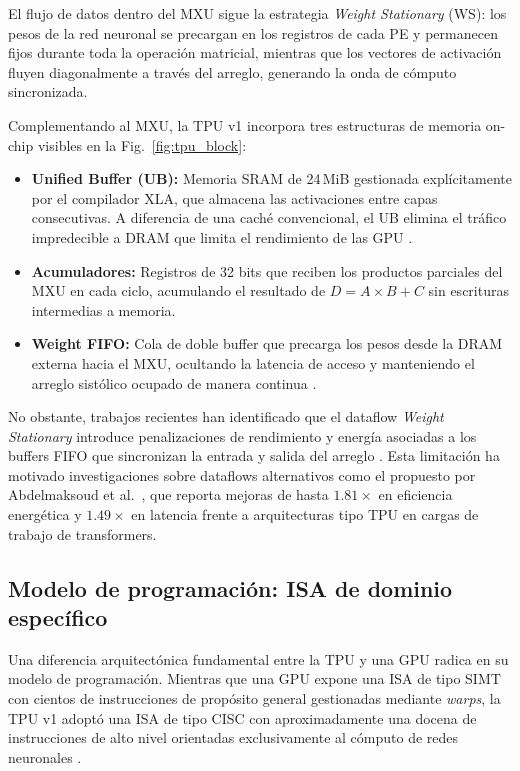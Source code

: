 \documentclass[conference]{IEEEtran}
\begin{document}
El flujo de datos dentro del MXU sigue la estrategia \textit{Weight Stationary} (WS): los pesos de la red neuronal se precargan en los registros de cada PE y permanecen fijos durante toda la operación matricial, mientras que los vectores de activación fluyen diagonalmente a través del arreglo, generando la onda de cómputo sincronizada.
 
Complementando al MXU, la TPU v1 incorpora tres estructuras de memoria on-chip visibles en la Fig.~\ref{fig:tpu_block}:
 
\begin{itemize}
    \item \textbf{Unified Buffer (UB):} Memoria SRAM de 24\,MiB gestionada explícitamente por el compilador XLA, que almacena las activaciones entre capas consecutivas. A diferencia de una caché convencional, el UB elimina el tráfico impredecible a DRAM que limita el rendimiento de las GPU \cite{jouppi2023tpuv4}.
 
    \item \textbf{Acumuladores:} Registros de 32 bits que reciben los productos parciales del MXU en cada ciclo, acumulando el resultado de $D = A \times B + C$ sin escrituras intermedias a memoria.
 
    \item \textbf{Weight FIFO:} Cola de doble buffer que precarga los pesos desde la DRAM externa hacia el MXU, ocultando la latencia de acceso y manteniendo el arreglo sistólico ocupado de manera continua \cite{jouppi2017tpu}.
\end{itemize}
 
No obstante, trabajos recientes han identificado que el dataflow \textit{Weight Stationary} introduce penalizaciones de rendimiento y energía asociadas a los buffers FIFO que sincronizan la entrada y salida del arreglo \cite{abdelmaksoud2026dip}. Esta limitación ha motivado investigaciones sobre dataflows alternativos como el propuesto por Abdelmaksoud et al.~\cite{abdelmaksoud2026dip}, que reporta mejoras de hasta $1.81\times$ en eficiencia energética y $1.49\times$ en latencia frente a arquitecturas tipo TPU en cargas de trabajo de transformers.
 

\subsection{Modelo de programación: ISA de dominio específico}

Una diferencia arquitectónica fundamental entre la TPU y una GPU radica en su modelo de programación. Mientras que una GPU expone una ISA de tipo SIMT con cientos de instrucciones de propósito general gestionadas mediante \textit{warps}, la TPU v1 adoptó una ISA de tipo CISC con aproximadamente una docena de instrucciones de alto nivel orientadas exclusivamente al cómputo de redes neuronales \cite{jouppi2017tpu}.
\end{document}

